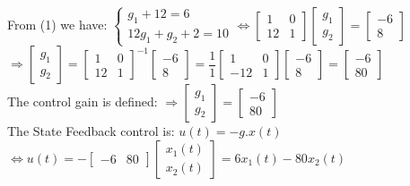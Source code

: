 \documentclass[14pt,a4paper]{article}
\begin{document}
\begin{enumerate}
		From (1) we have:
		$\begin{cases} g_1+12 = 6 \\ 12g_1 + g_2 + 2 = 10	\end{cases} \Leftrightarrow \begin{bmatrix} 1&0 \\ 12&1 \end{bmatrix} \begin{bmatrix} g_1\\g_2 \end{bmatrix} = \begin{bmatrix} -6\\8 \end{bmatrix} $ \\[0.2cm]
		$ \Rightarrow \begin{bmatrix} g_1\\g_2 \end{bmatrix} = {\begin{bmatrix} 1&0 \\ 12&1\end{bmatrix}}^{-1} \begin{bmatrix} -6\\8 \end{bmatrix} = \dfrac{1}{1} \begin{bmatrix} 1&0 \\ -12&1 \end{bmatrix} \begin{bmatrix} -6\\8 \end{bmatrix} =  \begin{bmatrix} -6\\80 \end{bmatrix}$ \\[0.2cm]
		The control gain is defined: $ \Rightarrow \begin{bmatrix} g_1\\g_2 \end{bmatrix} = \begin{bmatrix} -6\\80 \end{bmatrix}$ \\
		
		The State Feedback control is: $u(t) = -g.x(t) $\\
		\hspace*{1cm} $\Leftrightarrow u(t) = -\begin{bmatrix} -6&80 \end{bmatrix} \begin{bmatrix} x_1(t)\\x_2(t) \end{bmatrix} = 6x_1(t) - 80x_2(t)$ \\
		

\end{enumerate}
\end{document}
